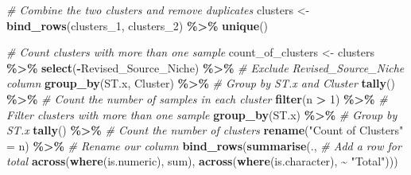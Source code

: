 \documentclass[
]{article}
\newenvironment{Shaded}{\begin{snugshade}}{\end{snugshade}}
\newcommand{\CommentTok}[1]{\textcolor[rgb]{0.56,0.35,0.01}{\textit{#1}}}
\newcommand{\DecValTok}[1]{\textcolor[rgb]{0.00,0.00,0.81}{#1}}
\newcommand{\FunctionTok}[1]{\textcolor[rgb]{0.13,0.29,0.53}{\textbf{#1}}}
\newcommand{\NormalTok}[1]{#1}
\newcommand{\OtherTok}[1]{\textcolor[rgb]{0.56,0.35,0.01}{#1}}
\newcommand{\SpecialCharTok}[1]{\textcolor[rgb]{0.81,0.36,0.00}{\textbf{#1}}}
\newcommand{\StringTok}[1]{\textcolor[rgb]{0.31,0.60,0.02}{#1}}
\begin{document}
\begin{Shaded}
\begin{Highlighting}[]
\CommentTok{\# Combine the two clusters and remove duplicates}
\NormalTok{clusters }\OtherTok{\textless{}{-}} \FunctionTok{bind\_rows}\NormalTok{(clusters\_1, clusters\_2) }\SpecialCharTok{\%\textgreater{}\%} \FunctionTok{unique}\NormalTok{()}

\CommentTok{\# Count clusters with more than one sample}
\NormalTok{count\_of\_clusters }\OtherTok{\textless{}{-}}\NormalTok{ clusters }\SpecialCharTok{\%\textgreater{}\%}
  \FunctionTok{select}\NormalTok{(}\SpecialCharTok{{-}}\NormalTok{Revised\_Source\_Niche) }\SpecialCharTok{\%\textgreater{}\%}             \CommentTok{\# Exclude Revised\_Source\_Niche column}
  \FunctionTok{group\_by}\NormalTok{(ST.x, Cluster) }\SpecialCharTok{\%\textgreater{}\%}                   \CommentTok{\# Group by ST.x and Cluster}
  \FunctionTok{tally}\NormalTok{() }\SpecialCharTok{\%\textgreater{}\%}                                   \CommentTok{\# Count the number of samples in each cluster}
  \FunctionTok{filter}\NormalTok{(n }\SpecialCharTok{\textgreater{}} \DecValTok{1}\NormalTok{) }\SpecialCharTok{\%\textgreater{}\%}                             \CommentTok{\# Filter clusters with more than one sample}
  \FunctionTok{group\_by}\NormalTok{(ST.x) }\SpecialCharTok{\%\textgreater{}\%}                            \CommentTok{\# Group by ST.x}
  \FunctionTok{tally}\NormalTok{() }\SpecialCharTok{\%\textgreater{}\%}                                   \CommentTok{\# Count the number of clusters}
  \FunctionTok{rename}\NormalTok{(}\StringTok{"Count of Clusters"} \OtherTok{=}\NormalTok{ n) }\SpecialCharTok{\%\textgreater{}\%}           \CommentTok{\# Rename our column}
  \FunctionTok{bind\_rows}\NormalTok{(}\FunctionTok{summarise}\NormalTok{(.,                        }\CommentTok{\# Add a row for total}
                      \FunctionTok{across}\NormalTok{(}\FunctionTok{where}\NormalTok{(is.numeric), sum),}
                      \FunctionTok{across}\NormalTok{(}\FunctionTok{where}\NormalTok{(is.character), }\SpecialCharTok{\textasciitilde{}} \StringTok{"Total"}\NormalTok{)))}


\end{Highlighting}
\end{Shaded}
\end{document}
